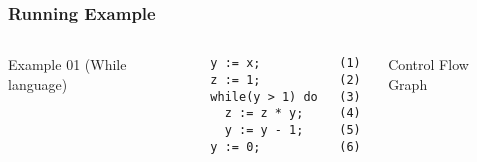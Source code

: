 \begin{frame}[fragile]
  \frametitle{Running Example}
  
  \begin{columns}
Example 01 (While language)
    
\begin{verbatim}
y := x;           (1)
z := 1;           (2)
while(y > 1) do   (3)
  z := z * y;     (4) 
  y := y - 1;     (5) 
y := 0;           (6) 
\end{verbatim}
\pause Control Flow Graph

\end{columns}
\end{frame}
